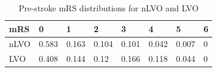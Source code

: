 \begin{table}
\caption{Pre-stroke mRS distributions for nLVO and LVO}\label{tab:pre_stroke}
\centering

\begin{tabular}{l | l l l l l l l}
mRS & 0 & 1 & 2 & 3 & 4 & 5 & 6 \\
\hline
nLVO & 0.583 & 0.163 & 0.104 & 0.101 & 0.042 & 0.007 & 0 \\
LVO & 0.408 & 0.144 & 0.12 & 0.166 & 0.118 & 0.044 & 0 \\
\end{tabular}
\end{table}
